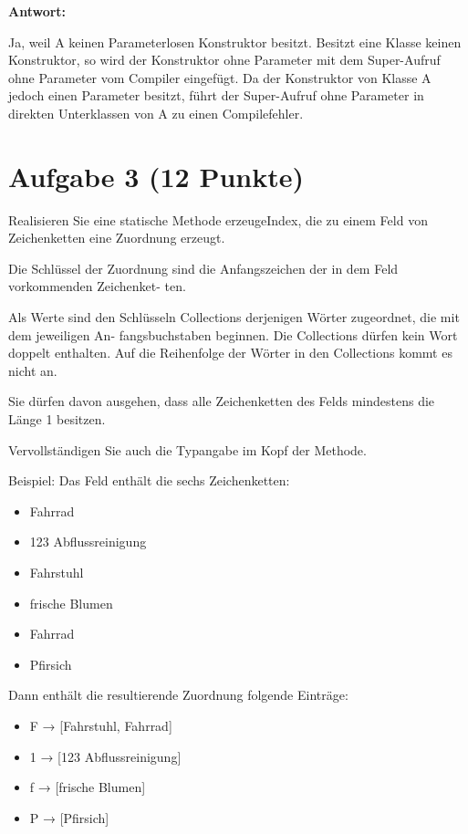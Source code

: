 \textbf{Antwort:}

Ja, weil A keinen Parameterlosen Konstruktor besitzt. Besitzt eine Klasse
keinen Konstruktor, so wird der Konstruktor ohne Parameter mit dem Super-Aufruf
ohne Parameter vom Compiler eingefügt. Da der Konstruktor von Klasse A jedoch
einen Parameter besitzt, führt der Super-Aufruf ohne Parameter in direkten
Unterklassen von A zu einen Compilefehler.

\section{Aufgabe 3 (12 Punkte)}

Realisieren Sie eine statische Methode erzeugeIndex, die zu einem Feld von
Zeichenketten eine Zuordnung erzeugt.

Die Schlüssel der Zuordnung sind die Anfangszeichen der in dem Feld
vorkommenden Zeichenket- ten.

Als Werte sind den Schlüsseln Collections derjenigen Wörter zugeordnet, die mit
dem jeweiligen An- fangsbuchstaben beginnen. Die Collections dürfen kein Wort
doppelt enthalten. Auf die Reihenfolge der Wörter in den Collections kommt es
nicht an.

Sie dürfen davon ausgehen, dass alle Zeichenketten des Felds mindestens die
Länge 1 besitzen.

Vervollständigen Sie auch die Typangabe im Kopf der Methode.

Beispiel: Das Feld enthält die sechs Zeichenketten:

\begin{itemize}
    \item Fahrrad
    \item 123 Abflussreinigung
    \item Fahrstuhl
    \item frische Blumen
    \item Fahrrad
    \item Pfirsich
\end{itemize}

Dann enthält die resultierende Zuordnung folgende Einträge:

\begin{itemize}
    \item F → [Fahrstuhl, Fahrrad]
    \item 1 → [123 Abflussreinigung]
    \item f → [frische Blumen]
    \item P → [Pfirsich]
\end{itemize}

